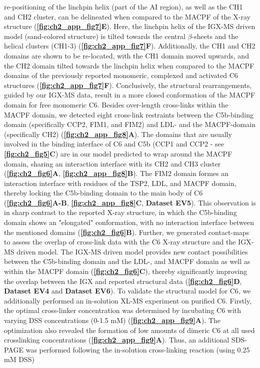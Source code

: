 re-positioning of the linchpin helix (part of the AI region), as well as the CH1 and CH2 cluster, can be delineated when compared to the MACPF of the X-ray structure (\textbf{\autoref{fig:ch2_app_fig7}E}). Here, the linchpin helix of the IGX-MS driven model (sand-colored structure) is tilted towards the central $\beta$-sheets and the helical clusters (CH1-3) (\textbf{\autoref{fig:ch2_app_fig7}F}). Additionally, the CH1 and CH2 domains are shown to be re-located, with the CH1 domain moved upwards, and the CH2 domain tilted towards the linchpin helix when compared to the MACPF domains of the previously reported monomeric, complexed and activated C6 structures (\textbf{\autoref{fig:ch2_app_fig7}F}). Conclusively, the structural rearrangements, guided by our IGX-MS data, result in a more closed conformation of the MACPF domain for free monomeric C6. Besides over-length cross-links within the MACPF domain, we detected eight cross-link restraints between the C5b-binding domain (specifically CCP2, FIM1, and FIM2) and LDL- and the MACPF-domain (specifically CH2) (\textbf{\autoref{fig:ch2_app_fig8}A}). The domains that are usually involved in the binding interface of C6 and C5b (CCP1 and CCP2 - see \textbf{\autoref{fig:ch2_fig5}C}) are in our model predicted to wrap around the MACPF domain, sharing an interaction interface with its CH2 and CH3 cluster (\textbf{\autoref{fig:ch2_fig6}A}, \textbf{\autoref{fig:ch2_app_fig8}B}). The FIM2 domain formes an interaction interface with residues of the TSP2, LDL, and MACPF domain, thereby locking the C5b-binding domain to the main body of C6 (\textbf{\autoref{fig:ch2_fig6}A-B}, \textbf{\autoref{fig:ch2_app_fig8}C}, \textbf{Dataset EV5}). This observation is in sharp contrast to the reported X-ray structure, in which the C5b-binding domain shows an "elongated" conformation, with no interaction interface between the mentioned domains (\textbf{\autoref{fig:ch2_fig6}B}). Further, we generated contact-maps to assess the overlap of cross-link data with the C6 X-ray structure and the IGX-MS driven model. The IGX-MS driven model provides new contact possibilities between the C5b-binding domain and the LDL-, and MACPF domain as well as within the MACPF domain (\textbf{\autoref{fig:ch2_fig6}C}), thereby significantly improving the overlap between the IGX and reported structural data (\textbf{\autoref{fig:ch2_fig6}D}, \textbf{Dataset EV4} and \textbf{Dataset EV6}). To validate the structural model for C6, we additionally performed an in-solution XL-MS experiment on purified C6. Firstly, the optimal cross-linker concentration was determined by incubating C6 with varying DSS concentrations (0-1.5 mM) (\textbf{\autoref{fig:ch2_app_fig9}A}). The optimization also revealed the formation of low amounts of dimeric C6 at all used crosslinking concentrations (\textbf{\autoref{fig:ch2_app_fig9}A}). Thus, an additional SDS-PAGE was performed following the in-solution cross-linking reaction (using 0.25 mM DSS)

